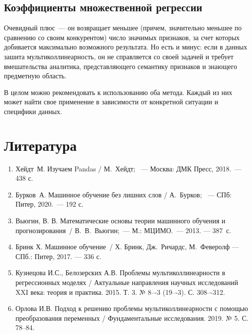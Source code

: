 \documentclass[a4paper,12pt]{article}
\begin{document}
\subsection{Коэффициенты множественной регрессии}

Очевидный плюс — он возвращает меньшее (причем, значительно меньшее по сравнению со своим конкурентом) число значимых признаков, за счет которых добивается максимально возможного результата. Но есть и минус: если в данных зашита мультиколлинеарность, он не справляется со своей задачей и требует вмешательства аналитика, представляющего семантику признаков и знающего предметную область.

В целом можно рекомендовать к использованию оба метода. Каждый из них может найти свое применение в зависимости от конкретной ситуации и специфики данных.

\section{Литература}


\begin{enumerate}
	\item Хейдт М. Изучаем Pandas / М. Хейдт;  — Москва: ДМК Пресс, 2018. — 438 с.
	\item Бурков А. Машинное обучение без лишних слов / А. Бурков;  — СПб: Питер, 2020. — 192 с.
	\item Вьюгин, В. В. Математические основы теории машинного обучения и прогнозирования / В. В. Вьюгин; — М.: МЦИМО. — 2013. — 387~с. 
	\item Бринк Х. Машинное обучение / Х. Бринк, Дж. Ричардс, М. Феверолф  — СПб.: Питер, 2017. — 336 с.
	\item Кузнецова И.С., Белозерских А.В. Проблемы мультиколлинеарности в регрессионных моделях / Актуальные направления научных исследований XXI века: теория и практика. 2015. Т. 3. № 8–-3 (19–-3). С. 308–-312.
	\item Орлова И.В. Подход к решению проблемы мультиколлинеарности с помощью преобразования переменных / Фундаментальные исследования. 2019. № 5. С. 78--84.
\end{enumerate}
\end{document}

